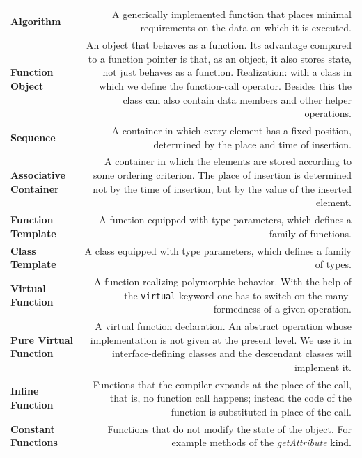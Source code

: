 \documentclass[margin=0px]{article}
\begin{document}
\begin{longtable}{L R}
\textbf{Algorithm} &
A generically implemented function that places minimal requirements on the data on which it is executed. \\[4pt]

\textbf{Function Object} &
An object that behaves as a function. Its advantage compared to a function pointer is that, as an object, it also stores state, not just behaves as a function. Realization: with a class in which we define the function-call operator. Besides this the class can also contain data members and other helper operations. \\[4pt]

\textbf{Sequence} &
A container in which every element has a fixed position, determined by the place and time of insertion. \\[4pt]

\textbf{Associative Container} &
A container in which the elements are stored according to some ordering criterion. The place of insertion is determined not by the time of insertion, but by the value of the inserted element. \\[4pt]

\textbf{Function Template} &
A function equipped with type parameters, which defines a family of functions. \\[4pt]

\textbf{Class Template} &
A class equipped with type parameters, which defines a family of types. \\[4pt]

\textbf{Virtual Function} &
A function realizing polymorphic behavior. With the help of the \texttt{virtual} keyword one has to switch on the many-formedness of a given operation. \\[4pt]

\textbf{Pure Virtual Function} &
A virtual function declaration. An abstract operation whose implementation is not given at the present level. We use it in interface-defining classes and the descendant classes will implement it. \\[4pt]

\textbf{Inline Function} &
Functions that the compiler expands at the place of the call, that is, no function call happens; instead the code of the function is substituted in place of the call. \\[4pt]

\textbf{Constant Functions} &
Functions that do not modify the state of the object. For example methods of the \textit{getAttribute} kind. \\[4pt]


\end{longtable}
\end{document}
